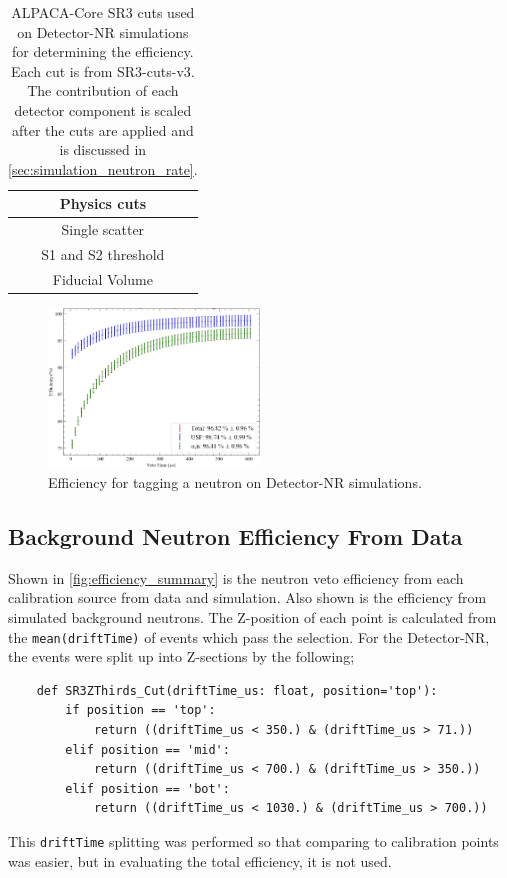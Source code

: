 \begin{table}
    \centering
    \begin{tabular}{c}
     Physics cuts  \\
     \hline
     Single scatter \\
     S1 and S2 threshold \\
     Fiducial Volume 
    \end{tabular}
    \caption{ALPACA-Core SR3 cuts used on Detector-NR simulations for determining the efficiency.
    Each cut is from SR3-cuts-v3.
    The contribution of each detector component is scaled after the cuts are applied and is discussed in \autoref{sec:simulation_neutron_rate}.
    }
    \label{tab:detector_nr_simulation_efficiency_cuts}
\end{table}


\begin{figure}
    \centering
    \includegraphics[width=0.5\textwidth]{figures/VetoEfficiency/det_nr_efficiency.png}
    \caption{Efficiency for tagging a neutron on Detector-NR simulations.}
    \label{fig:detector_nr_efficiency}
\end{figure}

\clearpage
\subsection{Background Neutron Efficiency From Data}
Shown in \autoref{fig:efficiency_summary} is the neutron veto efficiency from each calibration source from data and simulation.
Also shown is the efficiency from simulated background neutrons.
The Z-position of each point is calculated from the \lstinline{mean(driftTime)} of events which pass the selection.
For the Detector-NR, the events were split up into Z-sections by the following;
\begin{lstlisting}
    def SR3ZThirds_Cut(driftTime_us: float, position='top'):
        if position == 'top':
            return ((driftTime_us < 350.) & (driftTime_us > 71.))
        elif position == 'mid':
            return ((driftTime_us < 700.) & (driftTime_us > 350.))
        elif position == 'bot':
            return ((driftTime_us < 1030.) & (driftTime_us > 700.))
\end{lstlisting}
This \lstinline{driftTime} splitting was performed so that comparing to calibration points was easier, but in evaluating the total efficiency, it is not used.

